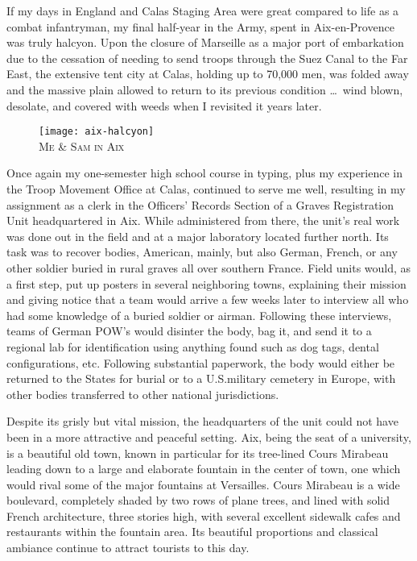 \documentclass[../m3y]{subfiles}
\begin{document}
If my days in England and Calas Staging Area were great compared to life as a combat infantryman, my final half-year in the Army, spent in Aix-en-Provence was truly halcyon. Upon the closure of Marseille as a major port of embarkation due to the cessation of needing to send troops through the Suez Canal to the Far East, the extensive tent city at Calas, holding up to 70,000 men, was folded away and the massive plain allowed to return to its previous condition \ldots\ wind blown, desolate, and covered with weeds when I revisited it years later.

\begin{figure}[h]
\centering
\texttt{[image: aix-halcyon]}\\
\medskip
{\newtimes\textsc{Me \& Sam in Aix}}
\end{figure}

Once again my one-semester high school course in typing, plus my experience in the Troop Movement Office at Calas, continued to serve me well, resulting in my assignment as a clerk in the Officers' Records Section of a Graves Registration Unit headquartered in Aix. While administered from there, the unit's real work was done out in the field and at a major laboratory located further north. Its task was to recover bodies, American, mainly, but also German, French, or any other soldier buried in rural graves all over southern France. Field units would, as a first step, put up posters in several neighboring towns, explaining their mission and giving notice that a team would arrive a few weeks later to interview all who had some knowledge of a buried soldier or airman. Following these interviews, teams of German POW's would disinter the body, bag it, and send it to a regional lab for identification using anything found such as dog tags, dental configurations, etc. Following substantial paperwork, the body would either be returned to the States for burial or to a U.S.\@ military cemetery in Europe, with other bodies transferred to other national jurisdictions.

Despite its grisly but vital mission, the headquarters of the unit could not have been in a more attractive and peaceful setting. Aix, being the seat of a university, is a beautiful old town, known in particular for its tree-lined Cours Mirabeau leading down to a large and elaborate fountain in the center of town, one which would rival some of the major fountains at Versailles. Cours Mirabeau is a wide boulevard, completely shaded by two rows of plane trees, and lined with solid French architecture, three stories high, with several excellent sidewalk cafes and restaurants within the fountain area. Its beautiful proportions and classical ambiance continue to attract tourists to this day.
\end{document}
